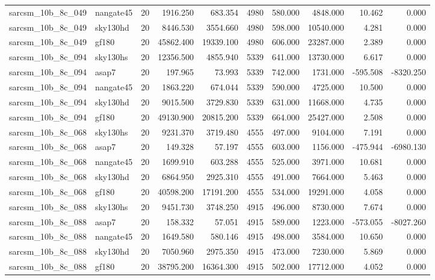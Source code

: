 \documentclass{article}
\begin{document}
\begin{longtable}{llrrrrrrrr}
sarcsm\_10b\_8c\_049 & nangate45 & 20 & 1916.250 & 683.354 & 4980 & 580.000 & 4848.000 & 10.462 & 0.000 \\
sarcsm\_10b\_8c\_049 & sky130hd & 20 & 8446.530 & 3554.660 & 4980 & 598.000 & 10540.000 & 4.281 & 0.000 \\
sarcsm\_10b\_8c\_049 & gf180 & 20 & 45862.400 & 19339.100 & 4980 & 606.000 & 23287.000 & 2.389 & 0.000 \\
sarcsm\_10b\_8c\_094 & sky130hs & 20 & 12356.500 & 4855.940 & 5339 & 641.000 & 13730.000 & 6.617 & 0.000 \\
sarcsm\_10b\_8c\_094 & asap7 & 20 & 197.965 & 73.993 & 5339 & 742.000 & 1731.000 & -595.508 & -8320.250 \\
sarcsm\_10b\_8c\_094 & nangate45 & 20 & 1863.220 & 674.044 & 5339 & 590.000 & 4725.000 & 10.500 & 0.000 \\
sarcsm\_10b\_8c\_094 & sky130hd & 20 & 9015.500 & 3729.830 & 5339 & 631.000 & 11668.000 & 4.735 & 0.000 \\
sarcsm\_10b\_8c\_094 & gf180 & 20 & 49130.900 & 20815.200 & 5339 & 664.000 & 25427.000 & 2.508 & 0.000 \\
sarcsm\_10b\_8c\_068 & sky130hs & 20 & 9231.370 & 3719.480 & 4555 & 497.000 & 9104.000 & 7.191 & 0.000 \\
sarcsm\_10b\_8c\_068 & asap7 & 20 & 149.328 & 57.197 & 4555 & 603.000 & 1156.000 & -475.944 & -6980.130 \\
sarcsm\_10b\_8c\_068 & nangate45 & 20 & 1699.910 & 603.288 & 4555 & 525.000 & 3971.000 & 10.681 & 0.000 \\
sarcsm\_10b\_8c\_068 & sky130hd & 20 & 6864.950 & 2925.310 & 4555 & 491.000 & 7664.000 & 5.463 & 0.000 \\
sarcsm\_10b\_8c\_068 & gf180 & 20 & 40598.200 & 17191.200 & 4555 & 534.000 & 19291.000 & 4.058 & 0.000 \\
sarcsm\_10b\_8c\_088 & sky130hs & 20 & 9451.730 & 3748.250 & 4915 & 496.000 & 8730.000 & 7.674 & 0.000 \\
sarcsm\_10b\_8c\_088 & asap7 & 20 & 158.332 & 57.051 & 4915 & 589.000 & 1223.000 & -573.055 & -8027.260 \\
sarcsm\_10b\_8c\_088 & nangate45 & 20 & 1649.580 & 580.146 & 4915 & 498.000 & 3584.000 & 10.650 & 0.000 \\
sarcsm\_10b\_8c\_088 & sky130hd & 20 & 7050.960 & 2975.350 & 4915 & 473.000 & 7230.000 & 5.869 & 0.000 \\
sarcsm\_10b\_8c\_088 & gf180 & 20 & 38795.200 & 16364.300 & 4915 & 502.000 & 17712.000 & 4.052 & 0.000 \\

\end{longtable}
\end{document}
